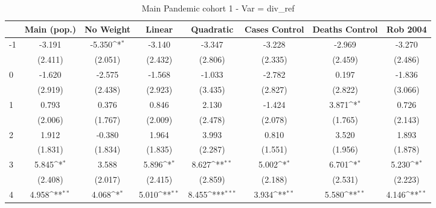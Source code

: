 \documentclass{article}
\begin{document}
{
\def\sym#1{\ifmmode^{#1}\else\(^{#1}\)\fi}
\begin{longtable}{l*{7}{c}}
\caption{Main Pandemic cohort 1 - Var = div\_ref}\\
\hline\hline\endfirsthead\hline\endhead\hline\endfoot\endlastfoot
                &\multicolumn{1}{c}{Main (pop.)}&\multicolumn{1}{c}{No Weight}&\multicolumn{1}{c}{Linear}&\multicolumn{1}{c}{Quadratic}&\multicolumn{1}{c}{Cases Control}&\multicolumn{1}{c}{Deaths Control}&\multicolumn{1}{c}{Rob 2004}\\
\hline
-1              &   -3.191         &   -5.350\sym{*}  &   -3.140         &   -3.347         &   -3.228         &   -2.969         &   -3.270         \\
                &  (2.411)         &  (2.051)         &  (2.432)         &  (2.806)         &  (2.335)         &  (2.459)         &  (2.486)         \\
0               &   -1.620         &   -2.575         &   -1.568         &   -1.033         &   -2.782         &    0.197         &   -1.836         \\
                &  (2.919)         &  (2.438)         &  (2.923)         &  (3.435)         &  (2.827)         &  (2.822)         &  (3.066)         \\
1               &    0.793         &    0.376         &    0.846         &    2.130         &   -1.424         &    3.871\sym{*}  &    0.726         \\
                &  (2.006)         &  (1.767)         &  (2.009)         &  (2.478)         &  (2.078)         &  (1.765)         &  (2.143)         \\
2               &    1.912         &   -0.380         &    1.964         &    3.993         &    0.810         &    3.520         &    1.893         \\
                &  (1.831)         &  (1.834)         &  (1.835)         &  (2.287)         &  (1.551)         &  (1.956)         &  (1.878)         \\
3               &    5.845\sym{*}  &    3.588         &    5.896\sym{*}  &    8.627\sym{**} &    5.002\sym{*}  &    6.701\sym{*}  &    5.230\sym{*}  \\
                &  (2.408)         &  (2.017)         &  (2.415)         &  (2.859)         &  (2.188)         &  (2.531)         &  (2.223)         \\
4               &    4.958\sym{**} &    4.068\sym{*}  &    5.010\sym{**} &    8.455\sym{***}&    3.934\sym{**} &    5.580\sym{**} &    4.146\sym{**} \\

\end{longtable}}
\end{document}
